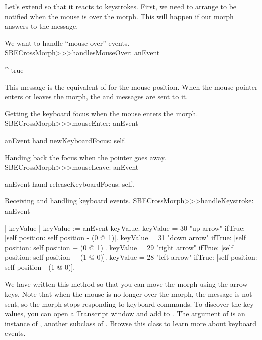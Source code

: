 \documentclass[a4paper,10pt,twoside]{book}
\begin{document}
Let's extend  so that it reacts to keystrokes.
First, we need to arrange to be notified when the mouse is over the morph.
This will happen if our morph answers  to the  message.

\begin{method}{We want to handle ``mouse over'' events.} 
SBECrossMorph>>>handlesMouseOver: anEvent

	^ true
\end{method}

\noindent
This message is the equivalent of  for the mouse position.
When the mouse pointer enters or leaves the morph, the  and  messages are sent to it.

\begin{method}{Getting the keyboard focus when the mouse enters the morph.}
SBECrossMorph>>>mouseEnter: anEvent

	anEvent hand newKeyboardFocus: self.
\end{method}

\begin{method}{Handing back the focus when the pointer goes away.}
SBECrossMorph>>>mouseLeave: anEvent

	anEvent hand releaseKeyboardFocus: self.
\end{method}

\begin{method}[handleKeystroke]{Receiving and handling keyboard events.}
SBECrossMorph>>>handleKeystroke: anEvent

	| keyValue |
	keyValue := anEvent keyValue.
	keyValue = 30	 "up arrow"
		ifTrue: [self position: self position - (0 @ 1)].
	keyValue = 31	 "down arrow"
		ifTrue: [self position: self position + (0 @ 1)].
	keyValue = 29	 "right arrow"
		ifTrue: [self position: self position + (1 @ 0)].
	keyValue = 28	 "left arrow"
		ifTrue: [self position: self position - (1 @ 0)].
\end{method}

We have written this method so that you can move the morph using the arrow keys.
Note that when the mouse is no longer over the morph, the  message is not sent, so the morph stops responding to keyboard commands.
To discover the key values, you can open a Transcript window and add   to .
The  argument of  is an instance of , another subclass of . Browse this class to learn more about keyboard events.
\end{document}
